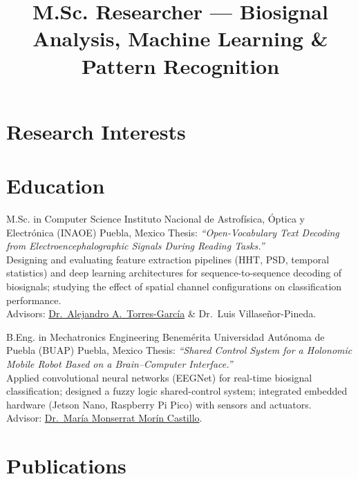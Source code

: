 \documentclass[11pt,a4paper,sans]{moderncv}
\title{M.Sc. Researcher --- Biosignal Analysis, Machine Learning \& Pattern Recognition}
\begin{document}
\makecvtitle

\section{Research Interests}

\section{Education}

  {M.Sc. in Computer Science}
  {Instituto Nacional de Astrof\'isica, \'Optica y Electr\'onica (INAOE)}
  {Puebla, Mexico}{}
  {Thesis: \textit{``Open-Vocabulary Text Decoding from Electroencephalographic Signals During Reading Tasks.''}\\
   Designing and evaluating feature extraction pipelines (HHT, PSD, temporal statistics) and deep learning architectures for sequence-to-sequence decoding of biosignals; studying the effect of spatial channel configurations on classification performance.\\
   Advisors: \href{https://scholar.google.com/citations?user=IyXV_oYAAAAJ}{Dr.\ Alejandro A.\ Torres-Garc\'ia} \& Dr.\ Luis Villase\~nor-Pineda.}

  {B.Eng. in Mechatronics Engineering}
  {Benem\'erita Universidad Aut\'onoma de Puebla (BUAP)}
  {Puebla, Mexico}{}
  {Thesis: \textit{``Shared Control System for a Holonomic Mobile Robot Based on a Brain--Computer Interface.''}\\
   Applied convolutional neural networks (EEGNet) for real-time biosignal classification; designed a fuzzy logic shared-control system; integrated embedded hardware (Jetson Nano, Raspberry Pi Pico) with sensors and actuators.\\
   Advisor: \href{https://scholar.google.com/citations?user=p_W-mx8AAAAJ}{Dr.\ Mar\'ia Monserrat Mor\'in Castillo}.}

\section{Publications}
\end{document}
